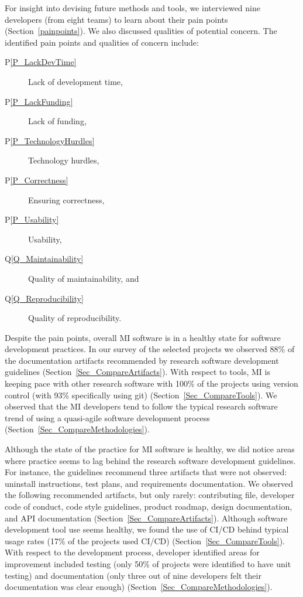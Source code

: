 \documentclass[final, 12pt, 3p, times]{elsarticle}
\newcommand{\ppref}[1]{P\ref{#1}}
\newcommand{\qref}[1]{Q\ref{#1}}
\begin{document}
For insight into devising future methods and tools, we interviewed nine
developers (from eight teams) to learn about their pain points
(Section~\ref{painpoints}).  We also discussed qualities of potential concern.
The identified pain points and qualities of concern include: 

\begin{description}
\item [\ppref{P_LackDevTime}] Lack of development time, %
\item [\ppref{P_LackFunding}] Lack of funding, %
\item [\ppref{P_TechnologyHurdles}] Technology hurdles, %
\item [\ppref{P_Correctness}] Ensuring correctness, %
\item [\ppref{P_Usability}] Usability, %
\item [\qref{Q_Maintainability}] Quality of maintainability, and %
\item [\qref{Q_Reproducibility}] Quality of reproducibility. %
\end{description}  

Despite the pain points, overall MI software is in a healthy state for software
development practices.  In our survey of the selected projects we observed 88\%
of the documentation artifacts recommended by research software development
guidelines (Section~\ref{Sec_CompareArtifacts}).  With respect to tools, MI is
keeping pace with other research software with 100\% of the projects using
version control (with 93\% specifically using git)
(Section~\ref{Sec_CompareTools}).  We observed that the MI developers tend to
follow the typical research software trend of using a quasi-agile software
development process (Section~\ref{Sec_CompareMethodologies}).

Although the state of the practice for MI software is healthy, we did notice
areas where practice seems to lag behind the research software development
guidelines.  For instance, the guidelines recommend three artifacts that were
not observed: uninstall instructions, test plans, and requirements
documentation. We observed the following recommended artifacts, but only rarely:
contributing file, developer code of conduct, code style guidelines, product
roadmap, design documentation, and API documentation
(Section~\ref{Sec_CompareArtifacts}). Although software development tool use
seems healthy, we found the use of CI/CD behind typical usage rates (17\% of the
projects used CI/CD) (Section~\ref{Sec_CompareTools}).  With respect to the
development process, developer identified areas for improvement included testing
(only 50\% of projects were identified to have unit testing) and documentation
(only three out of nine developers felt their documentation was clear enough)
(Section~\ref{Sec_CompareMethodologies}).
\end{document}
